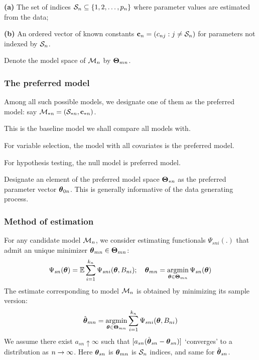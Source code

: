\documentclass[handout,10pt]{beamer}
\DeclareMathOperator*{\argmin}{argmin}
\begin{document}
\begin{frame}
\begin{minipage}{.6\textwidth}
\vspace{1em}
\noindent\textbf{(a)} The set of indices ${\cal{S}}_n \subseteq \{ 1, 2, \ldots, p_n \}$ where parameter values are {\colb estimated from the data};

\vspace{1em}
\noindent\textbf{(b)} An ordered vector of {\colb known constants} ${\bf{c}}_n = (c_{nj}: j \neq {\cal{S}}_n)$ for parameters not indexed by ${\cal{S}}_n$.

\vspace{1em}
Denote the model space of ${\cal{M}}_n$ by ${\boldsymbol{\Theta}}_{m n}$.
\end{minipage}
%
\end{frame}



\begin{frame}
\frametitle{The preferred model}
Among all such possible models, we designate one of them as the {\colbit preferred model}: say ${\cal{M}}_{* n} = ({\cal{S}}_{* n}, {\bf{c}}_{* n})$.

\vspace{1em}
This is the baseline model we shall compare all models with.

\begin{example}
For variable selection, the model with all covariates is the preferred model.

\vspace{1em}
For hypothesis testing, the null model is preferred model.
\end{example}

\vspace{1em}
Designate an element of the preferred model space ${\boldsymbol{\Theta}}_{* n}$ as the {\colbit preferred parameter vector} ${\boldsymbol{\theta}}_{0 n}$. This is generally informative of the data generating process.
\end{frame}

\begin{frame}
\frametitle{Method of estimation}
For any candidate model ${\cal{M}}_n$, we consider estimating functionals $\Psi_{s n i}(.)$ that admit an unique minimizer ${\boldsymbol{\theta}}_{m n} \in {\boldsymbol{\Theta}}_{m n}$:
%
$$
\Psi_{s n} (\bftheta) = \BE \sum_{i=1}^{k_n} \Psi_{s n i} (\bftheta, B_{n i});
\quad
\bftheta_{m n} = \argmin_{\bftheta \in \bfTheta_{m n}} \Psi_{s n} ( \bftheta)
$$
%
The estimate corresponding to model ${\cal{M}}_n$ is obtained by minimizing its sample version:
%
$$
\hat \bftheta_{m n} = \argmin_{\bftheta \in \bfTheta_{m n}} \sum_{i=1}^{k_n} \Psi_{s n i} (\bftheta, B_{n i})
$$
%
We assume there exist $a_{s n} \uparrow \infty$ such that $[ a_{s n} (\hat {{\boldsymbol{\theta}}}_{s n} - {\boldsymbol{\theta}}_{s n}) ]$ `converges' to a distribution as $n \rightarrow \infty$. Here ${\boldsymbol{\theta}}_{s n}$ is ${\boldsymbol{\theta}}_{m n}$ is ${\cal{S}}_n$ indices, and same for $\hat {{\boldsymbol{\theta}}}_{s n}$.
\end{frame}
\end{document}
